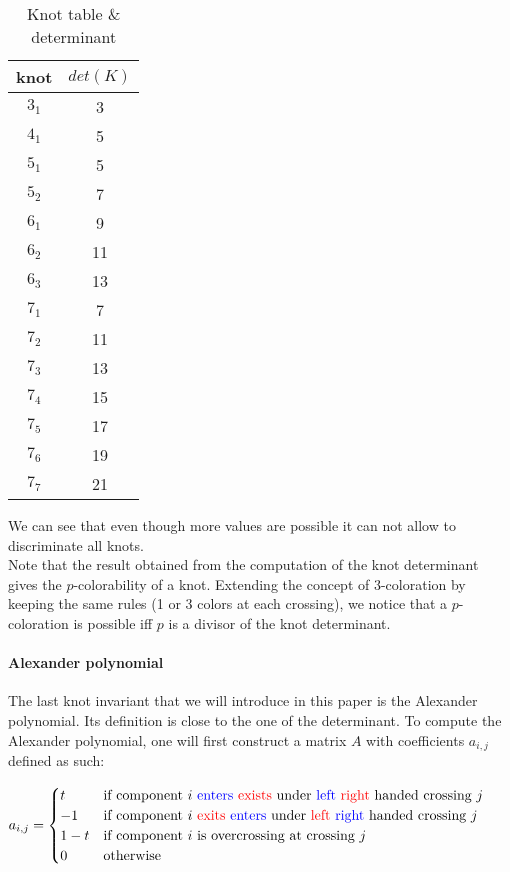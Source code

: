 \documentclass[12pt, a4paper]{article}
\begin{document}
\begin{table}[H]
\begin{center}
  \begin{tabular}{| c | c |}
    \hline
    knot & $det(K)$\\
    \hline
    $3_1$ & 3\\
    \hline
    $4_1$ & 5\\
    \hline
    $5_1$ & 5\\
    \hline
    $5_2$ & 7\\
    \hline
    $6_1$ & 9\\
    \hline
    $6_2$ & 11\\
    \hline
    $6_3$ & 13\\
    \hline
    $7_1$ & 7\\
    \hline
    $7_2$ & 11\\
    \hline
    $7_3$ & 13\\
    \hline
    $7_4$ & 15\\
    \hline
    $7_5$ & 17\\
    \hline
    $7_6$ & 19\\
    \hline
    $7_7$ & 21\\
    \hline
  \end{tabular}
\end{center}
  \caption{Knot table \& determinant}
\label{tab:knot_determinant}
\end{table}

We can see that even though more values are possible it can not allow to discriminate all knots.\\

Note that the result obtained from the computation of the knot determinant gives the $p$-colorability of a knot. Extending the concept of $3$-coloration by keeping the same rules (1 or 3 colors at each crossing), we notice that a $p$-coloration is possible iff $p$ is a divisor of the knot determinant.

\paragraph{Alexander polynomial}

The last knot invariant that we will introduce in this paper is the Alexander polynomial. Its definition is close to the one of the determinant. To compute the Alexander polynomial, one will first construct a matrix $A$ with coefficients $a_{i,j}$ defined as such: 

\begin{center}
  $a_{i,j} =
  \begin{cases}
    t &\text{if component $i$ \textcolor{blue}{enters} \textcolor{red}{exists} under \textcolor{blue}{left} \textcolor{red}{right} handed crossing $j$}\\
    -1 &\text{if component $i$ \textcolor{red}{exits} \textcolor{blue}{enters} under \textcolor{red}{left} \textcolor{blue}{right} handed crossing $j$}\\
    1-t &\text{if component $i$ is overcrossing at crossing $j$}\\
    0 &\text{otherwise}
  \end{cases}$
\end{center}
\end{document}
